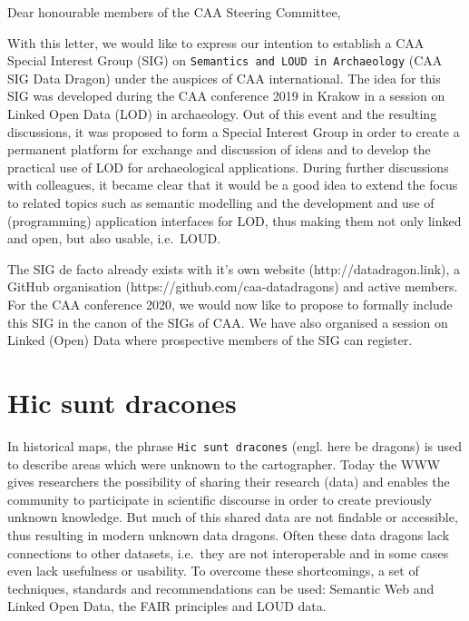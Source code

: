 \documentclass[a4paper]{article}
\begin{document}

\normalsize

Dear honourable members of the CAA Steering Committee,
\newline


With this letter, we would like to express our intention to establish a CAA Special Interest Group (SIG) on \texttt{Semantics\ and\ LOUD\ in\ Archaeology} (CAA SIG Data Dragon) under the auspices of CAA international. The idea for this SIG was developed during the CAA conference 2019 in Krakow in a session on Linked Open Data (LOD) in archaeology. Out of this event and the resulting discussions, it was proposed to form a Special Interest Group in order to create a permanent platform for exchange and discussion of ideas and to develop the practical use of LOD for archaeological applications. During further discussions with colleagues, it became clear that it would be a good idea to extend the focus to related topics such as semantic modelling and the development and use of (programming) application interfaces for LOD, thus making them not only linked and open, but also usable, i.e.~LOUD.
\newline



The SIG de facto already exists with it's own website (http://datadragon.link), a GitHub organisation (https://github.com/caa-datadragons) and active members. For the CAA conference 2020, we would now like to propose to formally include this SIG in the canon of the SIGs of CAA. We have also organised a session on Linked (Open) Data where prospective members of the SIG can register.

\section{Hic sunt dracones}\label{hic-sunt-dracones}

In historical maps, the phrase \texttt{Hic\ sunt\ dracones} (engl. here be dragons) is used to describe areas which were unknown to the cartographer. Today the WWW gives researchers the possibility of sharing their research (data) and enables the community to participate in scientific discourse in order to create previously unknown knowledge. But much of this shared data are not findable or accessible, thus resulting in modern unknown data dragons. Often these data dragons lack connections to other datasets, i.e.~they are not interoperable and in some cases even lack usefulness or usability. To overcome these shortcomings, a set of techniques, standards and recommendations can be used: Semantic Web and Linked Open Data, the FAIR principles and LOUD data.
\end{document}
